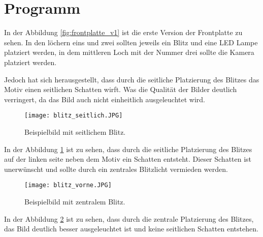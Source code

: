 \graphicspath{{images/mechanics}}

\section{Programm}


In der Abbildung \ref{fig:frontplatte_v1} ist die erste Version der Frontplatte zu sehen.
In den löchern eins und zwei sollten jeweils ein Blitz und eine LED Lampe platziert werden,
in dem mittleren Loch mit der Nummer drei sollte die Kamera platziert werden.


Jedoch hat sich herausgestellt, dass durch die seitliche Platzierung des Blitzes
das Motiv einen seitlichen Schatten wirft. Was die Qualität der Bilder deutlich verringert,
da das Bild auch nicht einheitlich ausgeleuchtet wird.

\newpage
\begin{figure}[H]
    \centering
    \texttt{[image: blitz\_seitlich.JPG]}
    \caption{Beispielbild mit seitlichem Blitz.}
    \label{fig:seitlicher_blitzt}
\end{figure}

In der Abbildung \ref{fig:seitlicher_blitzt} ist zu sehen, dass durch die seitliche Platzierung des Blitzes 
auf der linken seite neben dem Motiv ein Schatten entsteht. Dieser Schatten ist unerwünscht und sollte
durch ein zentrales Blitzlicht vermieden werden.

\begin{figure}[H]
    \centering
    \texttt{[image: blitz\_vorne.JPG]}
    \caption{Beispielbild mit zentralem Blitz.}
    \label{fig:zentraler_blitz}
\end{figure}

In der Abbildung \ref{fig:zentraler_blitz} ist zu sehen, dass durch die zentrale Platzierung des Blitzes,
das Bild deutlich besser ausgeleuchtet ist und keine seitlichen Schatten entstehen. 